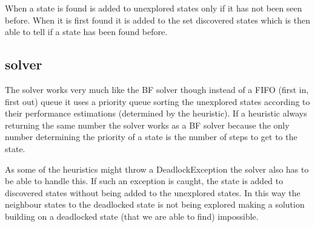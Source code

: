 When a state is found is added to unexplored states only if it has not been seen before. When it is first found it is added to the set discovered states which is then able to tell if a state has been found before.

\subsection{\astar solver}
The \astar solver works very much like the BF solver though instead of a FIFO (first in, first out) queue it uses a priority queue sorting the unexplored states according to their performance estimations (determined by the heuristic). If a heuristic always returning the same number the solver works as a BF solver because the only number determining the priority of a state is the number of steps to get to the state.

As some of the heuristics might throw a DeadlockException the \astar solver also has to be able to handle this. If such an exception is caught, the state is added to discovered states without being added to the unexplored states. In this way the neighbour states to the deadlocked state is not being explored making a solution building on a deadlocked state (that we are able to find) impossible.

